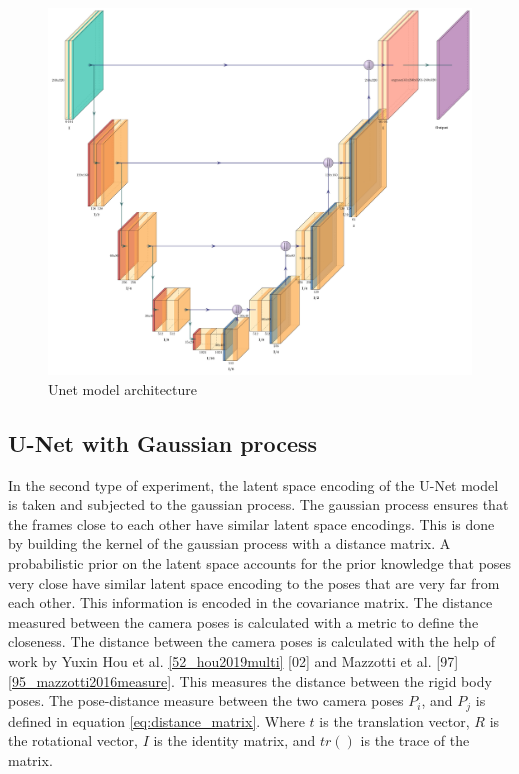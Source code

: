 	\begin{figure}[h]
		\centering
		\includegraphics[width=14cm]{images/Unet.jpg}
		\caption{Unet model architecture}
		\label{fig:unet_model}
	\end{figure}
	
    \subsection{U-Net with Gaussian process}
    
    In the second type of experiment, the latent space encoding of the U-Net model is taken and subjected to the gaussian process. The gaussian process ensures that the frames close to each other have similar latent space encodings. This is done by building the kernel of the gaussian process with a distance matrix. A probabilistic prior on the latent space accounts for the prior knowledge that poses very close have similar latent space encoding to the poses that are very far from each other. This information is encoded in the covariance matrix. The distance measured between the camera poses is calculated with a metric to define the closeness. The distance between the camera poses is calculated with the help of work by Yuxin Hou et al. \ref{52_hou2019multi} [02] and Mazzotti et al. [97] \ref{95_mazzotti2016measure}. This measures the distance between the rigid body poses. The pose-distance measure between the two camera poses $P_i$, and $P_j$ is defined in equation \ref{eq:distance_matrix}. Where $t$ is the translation vector, $R$ is the rotational vector, $I$ is the identity matrix, and $tr()$ is the trace of the matrix.  
    
